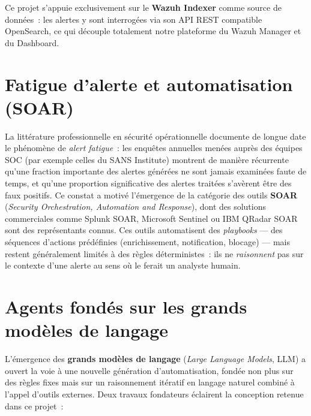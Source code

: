 Ce projet s'appuie exclusivement sur le \textbf{Wazuh Indexer} comme source
de données~: les alertes y sont interrogées via son API REST compatible
OpenSearch, ce qui découple totalement notre plateforme du Wazuh Manager et
du Dashboard.

\section{Fatigue d'alerte et automatisation (SOAR)}

La littérature professionnelle en sécurité opérationnelle documente de
longue date le phénomène de \textit{alert fatigue}~: les enquêtes annuelles
menées auprès des équipes SOC (par exemple celles du SANS Institute) montrent
de manière récurrente qu'une fraction importante des alertes générées ne
sont jamais examinées faute de temps, et qu'une proportion significative des
alertes traitées s'avèrent être des faux positifs. Ce constat a motivé
l'émergence de la catégorie des outils \textbf{SOAR}
(\textit{Security Orchestration, Automation and Response}), dont des
solutions commerciales comme Splunk SOAR, Microsoft Sentinel ou IBM QRadar
SOAR sont des représentants connus. Ces outils automatisent des
\textit{playbooks} — des séquences d'actions prédéfinies (enrichissement,
notification, blocage) — mais restent généralement limités à des règles
déterministes~: ils ne \textit{raisonnent} pas sur le contexte d'une alerte
au sens où le ferait un analyste humain.

\section{Agents fondés sur les grands modèles de langage}

L'émergence des \textbf{grands modèles de langage} (\textit{Large Language
Models}, LLM) a ouvert la voie à une nouvelle génération d'automatisation,
fondée non plus sur des règles fixes mais sur un raisonnement itératif en
langage naturel combiné à l'appel d'outils externes. Deux travaux
fondateurs éclairent la conception retenue dans ce projet~:

